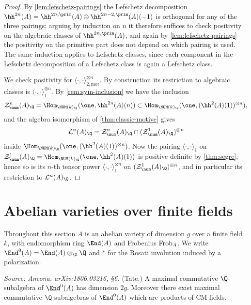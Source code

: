 \begin{proof}
  By \cref{lem:lefschetz-pairings} the Lefschetz decomposition
  \(\hh^{2n}(A) = \hh^{2n,\prim}(A) \oplus \hh^{2n-2,\prim}(A)(-1)\) is orthogonal
  for any of the three pairings; arguing by induction on \(n\) it therefore
  suffices to check positivity on the algebraic classes of \(\hh^{2n,\prim}(A)\),
  and again by \cref{lem:lefschetz-pairings} the positivity on the primitive
  part does not depend on which pairing is used. The same induction applies to
  Lefschetz classes, since each component in the Lefschetz decomposition of a
  Lefschetz class is again a Lefschetz class.

  We check positivity for \(\langle \cdot, \cdot \rangle_{2,\mathrm{mot}}^{\otimes
  n}\). By construction its restriction to algebraic classes is
  \(\langle \cdot, \cdot \rangle_{1}^{\otimes n}\). By
  \cref{rem:sym-inclusion} we have the inclusion
  \[\mathcal{Z}^n_{\num}(A)_{\Q} = \Hom_{\NUM(k)_\Q}(\one, \hh^{2n}(A)(n))
    \subset \Hom_{\NUM(k)_\Q}(\one, (\hh^2(A)(1))^{\otimes n}),\]
  and the algebra isomorphism of \cref{thm:classic-motive} gives
  \[\mathcal{L}^{n}(A)_{\Q} =
    \mathcal{Z}^n_{\num}(A)_{\Q} \cap (\mathcal{Z}^1_{\num}(A)_{\Q})^{\otimes n}\]
  inside \(\Hom_{\NUM(k)_\Q}(\one, (\hh^2(A)(1))^{\otimes n})\). Now the pairing
  \(\langle \cdot, \cdot \rangle_1\) on
  \(\mathcal{Z}^1_{\num}(A)_{\Q} = \Hom_{\NUM(k)_\Q}(\one, \hh^2(A)(1))\) is
  positive definite by \cref{thm:segre}, hence so is its \(n\)-th tensor power
  \(\langle \cdot, \cdot \rangle_1^{\otimes n}\) on
  \((\mathcal{Z}^1_{\num}(A)_{\Q})^{\otimes n}\), and in particular its
  restriction to \(\mathcal{L}^{n}(A)_{\Q}\).
\end{proof}

\section{Abelian varieties over finite fields}

Throughout this section \(A\) is an abelian variety of dimension \(g\) over a
finite field \(k\), with endomorphism ring \(\End(A)\) and Frobenius
\(\mathrm{Frob}_A\). We write \(\End^0(A) = \End(A) \otimes_\Z \Q\) and \(*\) for the
Rosati involution induced by a polarization.

\begin{theorem}
  \label{thm:tate}
  \textit{Source: Ancona, arXiv:1806.03216, §6.}
  (Tate.) A maximal commutative \(\Q\)-subalgebra of \(\End^0(A)\) has dimension
  \(2g\). Moreover there exist maximal commutative \(\Q\)-subalgebras of
  \(\End^0(A)\) which are products of CM fields.
\end{theorem}

